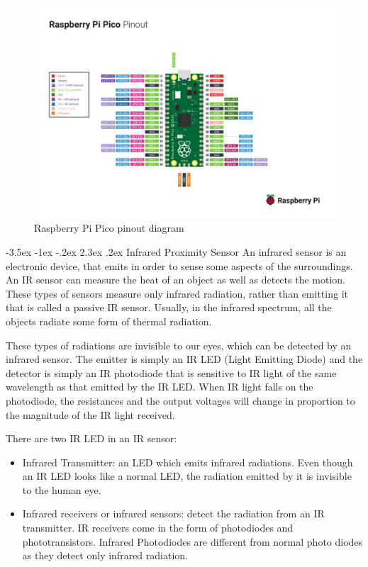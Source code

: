 \documentclass[a4paper,twoside]{report}
\makeatletter
\renewcommand\section{\@startsection {section}{1}{-1em}%
  {-3.5ex \@plus -1ex \@minus -.2ex}%
  {2.3ex \@plus.2ex}%
  {\normalfont\Large\bfseries}}
\makeatother
\begin{document}
\begin{figure}[H]
\centering
\includegraphics[scale=0.5, trim={0cm, 3cm, 0cm, 5cm},clip]{images/Pico-R3-A4-Pinout.pdf}
\caption{Raspberry Pi Pico pinout diagram\protect\footnotemark}
\end{figure}


\section{Infrared Proximity Sensor}
An infrared sensor is an electronic device, that emits in order to sense some aspects of the surroundings. An IR sensor can measure the heat of an object as well as detects the motion. These types of sensors measure only infrared radiation, rather than emitting it that is called a passive IR sensor. Usually, in the infrared spectrum, all the objects radiate some form of thermal radiation.

These types of radiations are invisible to our eyes, which can be detected by an infrared sensor. The emitter is simply an IR LED (Light Emitting Diode) and the detector is simply an IR photodiode that is sensitive to IR light of the same wavelength as that emitted by the IR LED. When IR light falls on the photodiode, the resistances and the output voltages will change in proportion to the magnitude of the IR light received.

There are two IR LED in an IR sensor:
\begin{itemize}
\item Infrared Transmitter: an LED which emits infrared radiations. Even though an IR LED looks like a normal LED, the radiation emitted by it is invisible to the human eye.
\item Infrared receivers or infrared sensors: detect the radiation from an IR transmitter. IR receivers come in the form of photodiodes and phototransistors. Infrared Photodiodes are different from normal photo diodes as they detect only infrared radiation.
\end{itemize}
\end{document}
